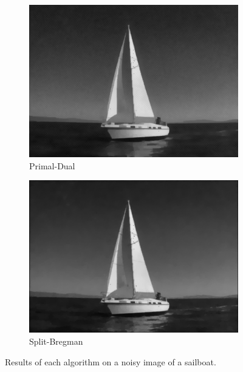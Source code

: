 \documentclass[11pt]{article}
\begin{document}
\begin{figure}
\begin{subfigure}[b]{0.4\textwidth}
\includegraphics[width=\textwidth]{sailboat_10_pd}
\caption{Primal-Dual}
\label{sail:pd}
\end{subfigure}
\begin{subfigure}[b]{0.4\textwidth}
\centering
\includegraphics[width=\textwidth]{sailboat_10_sb}
\caption{Split-Bregman}
\label{sail:sb}
\end{subfigure}
\caption{Results of each algorithm on a noisy image of a sailboat.}
\label{fig:sailboat:dn}
\end{figure}
\end{document}
